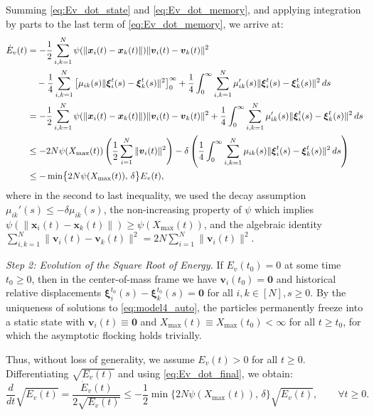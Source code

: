 \documentclass[11pt]{amsart}
\numberwithin{equation}{section}
\begin{document}
Summing \eqref{eq:Ev_dot_state} and \eqref{eq:Ev_dot_memory}, and applying integration by parts to the last term of \eqref{eq:Ev_dot_memory}, we arrive at:
{\small
\begin{align}\label{eq:Ev_dot_final}
\dot{E}_v(t) &= -\frac12\sum_{i,k=1}^N\psi(\|\boldsymbol{x}_i(t)-\boldsymbol{x}_k(t)\|)\|\boldsymbol{v}_i(t)-\boldsymbol{v}_k(t)\|^2 \notag \\
&\quad - \frac{1}{4}\sum_{i,k=1}^N \left[ \mu_{ik}(s) \|\boldsymbol{\xi}_i^t(s) - \boldsymbol{\xi}_k^t(s)\|^2 \right]_0^\infty + \frac14\int_0^\infty\sum_{i,k=1}^N \mu_{ik}'(s)\|\boldsymbol{\xi}_i^t(s)-\boldsymbol{\xi}_k^t(s)\|^2\,ds \notag \\
&= -\frac12\sum_{i,k=1}^N\psi(\|\boldsymbol{x}_i(t)-\boldsymbol{x}_k(t)\|)\|\boldsymbol{v}_i(t)-\boldsymbol{v}_k(t)\|^2 + \frac14\int_0^\infty\sum_{i,k=1}^N \mu_{ik}'(s)\|\boldsymbol{\xi}_i^t(s)-\boldsymbol{\xi}_k^t(s)\|^2\,ds\nonumber\\
&\le -2N\psi(X_{\max}(t))\left(\frac12\sum_{i=1}^N\|\boldsymbol{v}_i(t)\|^2\right) - \delta\left(\frac14\int_0^\infty\sum_{i,k=1}^N \mu_{ik}(s)\|\boldsymbol{\xi}_i^t(s)-\boldsymbol{\xi}_k^t(s)\|^2\,ds\right) \notag \\
&\le -\min\bigl\{2N\psi(X_{\max}(t)),\, \delta\bigr\} E_v(t),
\end{align}
}
where in the second to last inequality, we used the decay assumption $\mu_{ik}'(s)\le-\delta\mu_{ik}(s)$, the non-increasing property of $\psi$ which implies $\psi(\|\boldsymbol{x}_i(t)-\boldsymbol{x}_k(t)\|) \ge \psi(X_{\max}(t))$, and the algebraic identity $\sum\limits_{i,k=1}^N \|\boldsymbol{v}_i(t)-\boldsymbol{v}_k(t)\|^2 = 2N \sum\limits_{i=1}^N \|\boldsymbol{v}_i(t)\|^2$.

\noindent\textit{Step 2: Evolution of the Square Root of Energy.}
If $E_v(t_0) = 0$ at some time $t_0 \ge 0$, then in the center-of-mass frame we have $\boldsymbol{v}_i(t_0) = \mathbf{0}$ and historical relative displacements $\boldsymbol{\xi}_i^{t_0}(s)-\boldsymbol{\xi}_k^{t_0}(s) = \mathbf{0}$ for all $i,k \in [N], s \ge 0$. By the uniqueness of solutions to \eqref{eq:model4_auto}, the particles permanently freeze into a static state with $\boldsymbol{v}_i(t) \equiv \mathbf{0}$ and $X_{\max}(t) \equiv X_{\max}(t_0) < \infty$ for all $t \ge t_0$, for which the asymptotic flocking holds trivially.

Thus, without loss of generality, we assume $E_v(t) > 0$ for all $t \ge 0$. Differentiating $\sqrt{E_v(t)}$ and using \eqref{eq:Ev_dot_final}, we obtain:
\begin{equation}\label{eq:sqrt_Ev_dot}
\frac{d}{dt}\sqrt{E_v(t)} = \frac{\dot{E}_v(t)}{2\sqrt{E_v(t)}} \le -\frac{1}{2} \min\bigl\{2N\psi(X_{\max}(t)),\, \delta\bigr\} \sqrt{E_v(t)}, \qquad \forall t \ge 0.
\end{equation}
\end{document}
